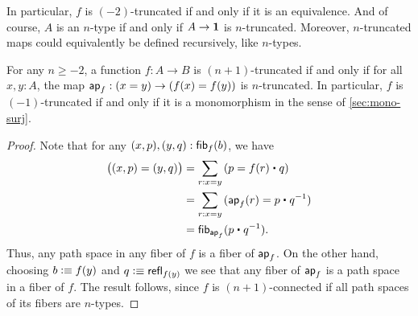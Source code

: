 In particular, $f$ is $(-2)$-truncated if and only if it is an equivalence.
And of course, $A$ is an $n$-type if and only if $A\to\mathbf{1}$ is $n$-truncated.
Moreover, $n$-truncated maps could equivalently be defined recursively, like $n$-types.

\begin{lem}\label{thm:modal-mono}
  For any $n\ge -2$, a function $f:A\to B$ is $(n+1)$-truncated if and only if for all $x,y:A$, the map $\mathsf{ap}_{f}:(x=y) \to (f(x)=f(y))$ is $n$-truncated.
  In particular, $f$ is $(-1)$-truncated if and only if it is a monomorphism in the sense of \autoref{sec:mono-surj}.
\end{lem}
\begin{proof}
  Note that for any $(x,p),(y,q):{\mathsf{fib}}_{f}(b)$, we have
  \begin{align*}
    \big((x,p) = (y,q)\big)
    &= \sm{r:x=y} (p = f(r)\ct q)\\
    &= \sm{r:x=y} (\apfunc f (r) = p\ct \opp q)\\
    &= \hfib{\apfunc{f}}{p\ct \opp q}.
  \end{align*}
  Thus, any path space in any fiber of $f$ is a fiber of $\mathsf{ap}_{f}$.
  On the other hand, choosing $b\vcentcolon\equiv f(y)$ and $q\vcentcolon\equiv \mathsf{refl}_{f(y)}$ we see that any fiber of $\mathsf{ap}_{f}$ is a path space in a fiber of $f$.
  The result follows, since $f$ is $(n+1)$-connected if all path spaces of its fibers are $n$-types.
\end{proof}




